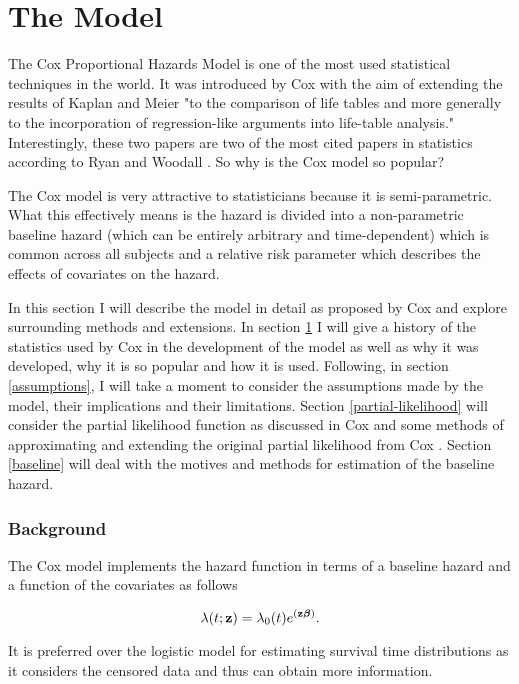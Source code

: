 \newpage
\part{The Model}

The Cox Proportional Hazards Model is one of the most used statistical techniques in the world. It was introduced by Cox  with the aim of extending the results of Kaplan and Meier  "to the comparison of life tables and more generally to the incorporation of regression-like arguments into life-table analysis." Interestingly, these two papers are two of the most cited papers in statistics according to Ryan and Woodall . So why is the Cox model so popular?

The Cox model is very attractive to statisticians because it is semi-parametric. What this effectively means is the hazard is divided into a non-parametric baseline hazard (which can be entirely arbitrary and time-dependent) which is common across all subjects and a relative risk parameter which describes the effects of covariates on the hazard.

In this section I will describe the model in detail as proposed by Cox and explore surrounding methods and extensions. In section \ref{background} I will give a history of the statistics used by Cox in the development of the model as well as why it was developed, why it is so popular and how it is used. Following, in section \ref{assumptions}, I will take a moment to consider the assumptions made by the model, their implications and their limitations. Section \ref{partial-likelihood} will consider the partial likelihood function as discussed in Cox  and some methods of approximating and extending the original partial likelihood from Cox . Section \ref{baseline} will deal with the motives and methods for estimation of the baseline hazard.

\section{Background}\label{background}

The Cox model implements the hazard function in terms of a baseline hazard and a function of the covariates as follows

\begin{equation}\label{cox-hazard}
    \lambda(t;\textbf{z})=\lambda_0(t)e^{(\textbf{z}\boldsymbol{\beta})}.
\end{equation}

It is preferred over the logistic model for estimating survival time distributions as it considers the censored data and thus can obtain more information. 

